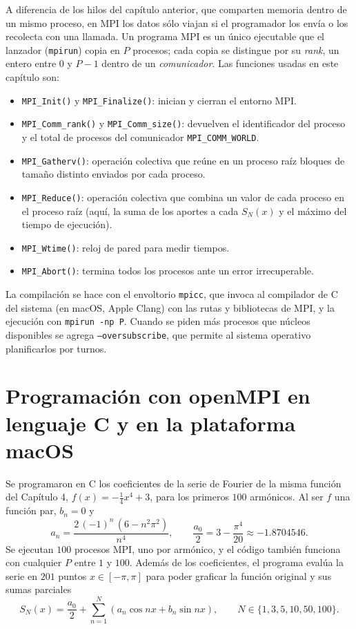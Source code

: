 A diferencia de los hilos del capítulo anterior, que comparten memoria dentro de un mismo proceso, en MPI los datos sólo viajan si el programador los envía o los recolecta con una llamada. Un programa MPI es un único ejecutable que el lanzador (\texttt{mpirun}) copia en $P$ procesos; cada copia se distingue por su \textit{rank}, un entero entre $0$ y $P-1$ dentro de un \textit{comunicador}. Las funciones usadas en este capítulo son:
\begin{itemize}
    \item \texttt{MPI\_Init()} y \texttt{MPI\_Finalize()}: inician y cierran el entorno MPI.
    \item \texttt{MPI\_Comm\_rank()} y \texttt{MPI\_Comm\_size()}: devuelven el identificador del proceso y el total de procesos del comunicador \texttt{MPI\_COMM\_WORLD}.
    \item \texttt{MPI\_Gatherv()}: operación colectiva que reúne en un proceso raíz bloques de tamaño distinto enviados por cada proceso.
    \item \texttt{MPI\_Reduce()}: operación colectiva que combina un valor de cada proceso en el proceso raíz (aquí, la suma de los aportes a cada $S_N(x)$ y el máximo del tiempo de ejecución).
    \item \texttt{MPI\_Wtime()}: reloj de pared para medir tiempos.
    \item \texttt{MPI\_Abort()}: termina todos los procesos ante un error irrecuperable.
\end{itemize}

La compilación se hace con el envoltorio \texttt{mpicc}, que invoca al compilador de C del sistema (en macOS, Apple Clang) con las rutas y bibliotecas de MPI, y la ejecución con \texttt{mpirun -np P}. Cuando se piden más procesos que núcleos disponibles se agrega \texttt{--oversubscribe}, que permite al sistema operativo planificarlos por turnos.

\section{Programación con openMPI en lenguaje C y en la plataforma macOS}
\label{sec:cap05:programacion}

Se programaron en C los coeficientes de la serie de Fourier de la misma función del Capítulo 4, $f(x) = -\frac{1}{4}x^4 + 3$, para los primeros $100$ armónicos. Al ser $f$ una función par, $b_n = 0$ y
\[
a_n = \frac{2\,(-1)^n\,\left(6 - n^2\pi^2\right)}{n^4},
\qquad
\frac{a_0}{2} = 3 - \frac{\pi^4}{20} \approx -1.8704546 .
\]
Se ejecutan $100$ procesos MPI, uno por armónico, y el código también funciona con cualquier $P$ entre $1$ y $100$. Además de los coeficientes, el programa evalúa la serie en $201$ puntos $x\in[-\pi,\pi]$ para poder graficar la función original y sus sumas parciales
\[
S_N(x) = \frac{a_0}{2} + \sum_{n=1}^{N}\left(a_n\cos nx + b_n\sin nx\right),
\qquad N \in \{1,3,5,10,50,100\}.
\]

